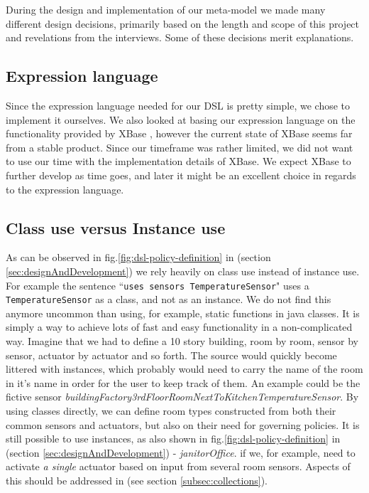 During the design and implementation of our meta-model we made many different design decisions, primarily based on the length and scope of this project and revelations from the interviews. Some of these decisions merit explanations.

\subsection{Expression language}
Since the expression language needed for our DSL is pretty simple, we chose to implement it ourselves. We also looked at basing our expression language on the functionality provided by XBase \cite{xbase}, however the current state of XBase seems far from a stable product. Since our timeframe was rather limited, we did not want to use our time with the implementation details of XBase. We expect XBase to further develop as time goes, and later it might be an excellent choice in regards to the expression language.

\subsection{Class use versus Instance use}
As can be observed in fig.\ref{fig:dsl-policy-definition} in  (section \ref{sec:designAndDevelopment}) we rely heavily on class use instead of instance use. For example the sentence ``\texttt{uses sensors TemperatureSensor}" uses a \texttt{TemperatureSensor} as a class, and not as an instance. We do not find this anymore uncommon than using, for example, static functions in java classes. It is simply a way to achieve lots of fast and easy functionality in a non-complicated way. Imagine that we had to define a 10 story building, room by room, sensor by sensor, actuator by actuator and so forth. The source would quickly become littered with instances, which probably would need to carry the name of the room in it's name in order for the user to keep track of them. An example could be the fictive sensor \textit{buildingFactory3rdFloorRoomNextToKitchenTemperatureSensor}. By using classes directly, we can define room types constructed from both their common sensors and actuators, but also on their need for governing policies. It is still possible to use instances, as also shown in fig.\ref{fig:dsl-policy-definition} in  (section \ref{sec:designAndDevelopment}) - \textit{janitorOffice}. if we, for example, need to activate \textit{a single} actuator based on input from several room sensors. Aspects of this should be addressed in  (see section \ref{subsec:collections}).
